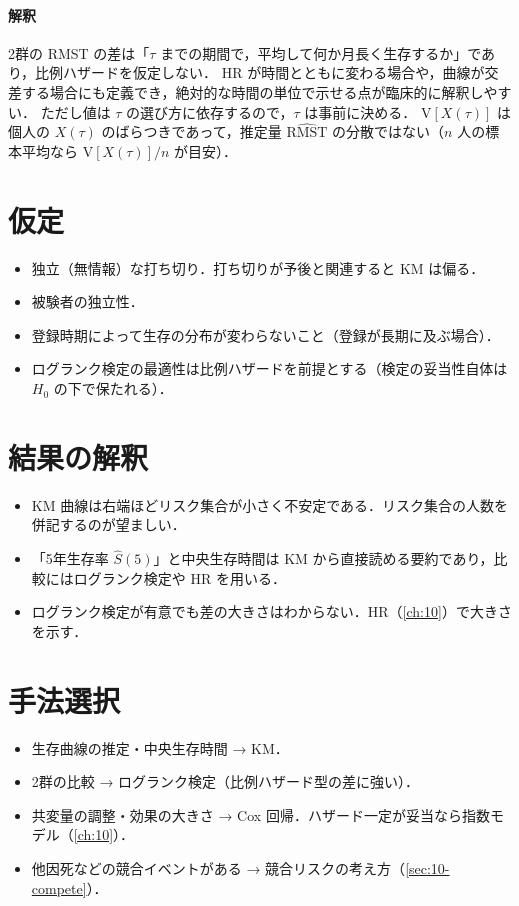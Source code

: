 \documentclass[a4paper,11pt,openany]{ltjsbook}
\newcommand{\V}{\mathrm{V}}
\begin{document}
\paragraph{解釈}
2群の RMST の差は「$\tau$ までの期間で，平均して何か月長く生存するか」であり，比例ハザードを仮定しない．
HR が時間とともに変わる場合や，曲線が交差する場合にも定義でき，絶対的な時間の単位で示せる点が臨床的に解釈しやすい．
ただし値は $\tau$ の選び方に依存するので，$\tau$ は事前に決める．
$\V[X(\tau)]$ は個人の $X(\tau)$ のばらつきであって，推定量 $\widehat{\mathrm{RMST}}$ の分散ではない（$n$ 人の標本平均なら $\V[X(\tau)]/n$ が目安）．

\section{仮定}\label{sec:09-assump}
\begin{itemize}
\item 独立（無情報）な打ち切り．打ち切りが予後と関連すると KM は偏る．
\item 被験者の独立性．
\item 登録時期によって生存の分布が変わらないこと（登録が長期に及ぶ場合）．
\item ログランク検定の最適性は比例ハザードを前提とする（検定の妥当性自体は $H_0$ の下で保たれる）．
\end{itemize}

\section{結果の解釈}\label{sec:09-interp}
\begin{itemize}
\item KM 曲線は右端ほどリスク集合が小さく不安定である．リスク集合の人数を併記するのが望ましい．
\item 「5年生存率 $\hat S(5)$」と中央生存時間は KM から直接読める要約であり，比較にはログランク検定や HR を用いる．
\item ログランク検定が有意でも差の大きさはわからない．HR（\cref{ch:10}）で大きさを示す．
\end{itemize}

\section{手法選択}\label{sec:09-choice}
\begin{itemize}
\item 生存曲線の推定・中央生存時間 → KM．
\item 2群の比較 → ログランク検定（比例ハザード型の差に強い）．
\item 共変量の調整・効果の大きさ → Cox 回帰．ハザード一定が妥当なら指数モデル（\cref{ch:10}）．
\item 他因死などの競合イベントがある → 競合リスクの考え方（\cref{sec:10-compete}）．
\end{itemize}
\end{document}
